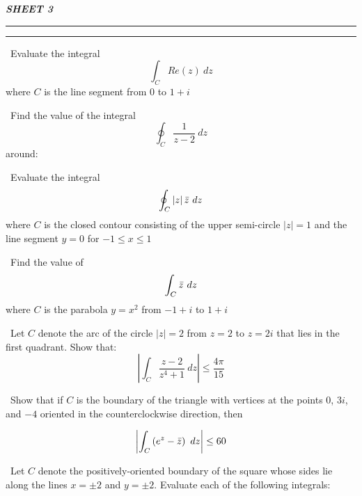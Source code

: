 \documentclass[12pt]{exam}
\newcommand{\comnum}[2]{\(#1 +i #2\)}
\newcommand{\comcir}[2]{\(\left| z - #1 \right| = #2\)}
\newcommand{\zbar}[0]{\Bar{z}}
\newcommand{\modz}[0]{\left|z\right|}
\newcommand{\cint}[1]{\int_C #1 \ dz}
\newcommand{\ccint}[1]{\oint_C #1 \ dz}
\newcommand{\C}[0]{\(C  \) }
\begin{document}
\begin{center}
    \bfseries\itshape\Huge
    SHEET 3
\end{center}
\hrule\vspace{0.2em}\hrule
\vspace{1em}

\begin{questions}
\large
\question\ Evaluate the integral \[\cint{Re(z)}\] where \C is the line segment from \(0\) to \comnum{1}{}


\question\ Find the value of the integral \[\ccint{\frac{1}{z - 2}}\] around:

\question\ Evaluate the integral \[\ccint{\left| z \right| \zbar}\] where \C is the closed contour consisting of the upper semi-circle \(\modz = 1\) and the line segment \(y = 0\) for \(-1 \leq x \leq 1\)


\question\ Find the value of \[\cint{\zbar}\] where \C is the parabola \(y = x^2\) from \comnum{-1}{} to \comnum{1}{}


\question\ Let \C denote the arc of the circle \(\modz = 2\) from \(z = 2\) to \(z = 2i\) that lies in the first quadrant. Show that:
\[\left| \cint{\frac{z - 2}{z^4 + 1}} \right| \leq \frac{4 \pi}{15}\]

\question\ Show that if \C is the boundary of the triangle with vertices at the points \(0\), \(3i\), and \(-4\) oriented in the counterclockwise direction, then

\[\left| \cint{\left( e^z - \zbar \right)} \right| \leq 60\]

\question\ Let \C denote the positively-oriented boundary of the square whose sides lie along the lines \(x = \pm2\) and \(y = \pm 2\). Evaluate each of the following integrals:
\end{questions}
\end{document}

